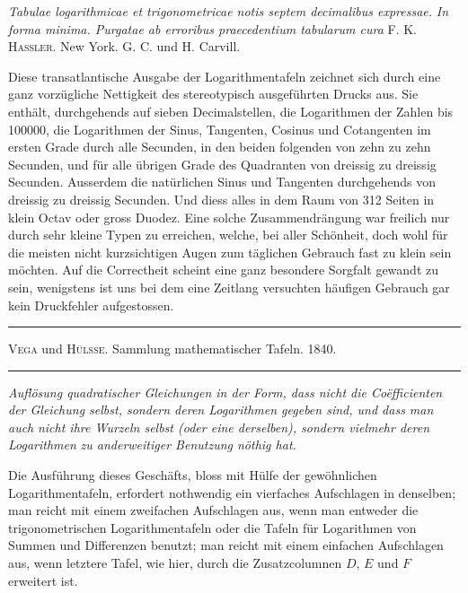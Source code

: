 \noindent\textit{Tabulae logarithmicae et trigonometricae notis septem decimalibus expressae.}
\textit{In forma minima. Purgatae ab erroribus praecedentium tabularum cura} F. K. \textsc{Hassler.} New York. G. C. und H. Carvill.

Diese transatlantische Ausgabe der Logarithmentafeln zeichnet sich durch
eine ganz vorzügliche Nettigkeit des stereotypisch ausgeführten Drucks aus. Sie
enthält, durchgehends auf sieben Decimalstellen, die Logarithmen der Zahlen
bis 100000, die Logarithmen der Sinus, Tangenten, Cosinus und Cotangenten
im ersten Grade durch alle Secunden, in den beiden folgenden von zehn zu zehn
Secunden, und für alle übrigen Grade des Quadranten von dreissig zu dreissig
Secunden. Ausserdem die natürlichen Sinus und Tangenten durchgehends von
dreissig zu dreissig Secunden. Und diess alles in dem Raum von 312 Seiten in
klein Octav oder gross Duodez. Eine solche Zusammendrängung war freilich nur
durch sehr kleine Typen zu erreichen, welche, bei aller Schönheit, doch wohl
für die meisten nicht kurzsichtigen Augen zum täglichen Gebrauch fast zu klein
sein möchten. Auf die Correctheit scheint eine ganz besondere Sorgfalt gewandt
zu sein, wenigstens ist uns bei dem eine Zeitlang versuchten häufigen Gebrauch
gar kein Druckfehler aufgestossen.

\par{}\begin{center}\rule{0.7\linewidth}{0.4pt}\par \textsc{Vega} und \textsc{Hülsse.} Sammlung mathematischer Tafeln. 1840.\par\rule{0.7\linewidth}{0.4pt}\end{center}

\noindent\textit{Auflösung quadratischer Gleichungen in der Form, dass nicht die Coëfficienten}
\textit{der Gleichung selbst, sondern deren Logarithmen gegeben sind, und dass man auch}
\textit{nicht ihre Wurzeln selbst (oder eine derselben), sondern vielmehr deren Logarithmen}
\textit{zu anderweitiger Benutzung nöthig hat.}

Die Ausführung dieses Geschäfts, bloss mit Hülfe der gewöhnlichen Logarithmentafeln, erfordert nothwendig ein vierfaches Aufschlagen in denselben; man
reicht mit einem zweifachen Aufschlagen aus, wenn man entweder die trigonometrischen Logarithmentafeln oder die Tafeln für Logarithmen von Summen und
Differenzen benutzt; man reicht mit einem einfachen Aufschlagen aus, wenn letztere Tafel, wie hier, durch die Zusatzcolumnen $D$, $E$ und $F$ erweitert ist.

